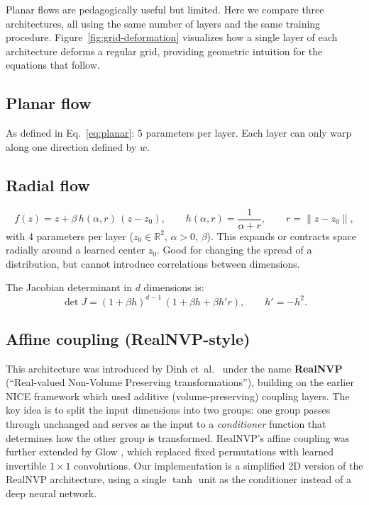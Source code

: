 \documentclass[11pt,letterpaper]{article}
\begin{document}
Planar flows are pedagogically useful but limited.
Here we compare three architectures, all using the same number of
layers and the same training procedure.
Figure~\ref{fig:grid-deformation} visualizes how a single layer of
each architecture deforms a regular grid, providing geometric intuition
for the equations that follow.

\subsection{Planar flow}
As defined in Eq.~\eqref{eq:planar}: 5 parameters per layer.
Each layer can only warp along one direction defined by $w$.

\subsection{Radial flow}
\begin{equation}
  f(z) = z + \beta\,h(\alpha, r)\,(z - z_0),
  \qquad h(\alpha, r) = \frac{1}{\alpha + r},
  \qquad r = \|z - z_0\|,
  \label{eq:radial}
\end{equation}
with 4 parameters per layer ($z_0 \in \mathbb{R}^2$, $\alpha > 0$, $\beta$).
This expands or contracts space radially around a learned center $z_0$.
Good for changing the spread of a distribution, but cannot introduce
correlations between dimensions.

The Jacobian determinant in $d$ dimensions is:
\begin{equation}
  \det J = (1 + \beta h)^{d-1}\,(1 + \beta h + \beta h' r),
  \qquad h' = -h^2.
\end{equation}

\subsection{Affine coupling (RealNVP-style)}
This architecture was introduced by Dinh et~al.\ \cite{dinh2017} under
the name \textbf{RealNVP} (``Real-valued Non-Volume Preserving
transformations''), building on the earlier NICE framework
\cite{dinh2014} which used additive (volume-preserving) coupling layers.
The key idea is to split the input dimensions into two groups: one group
passes through unchanged and serves as the input to a \emph{conditioner}
function that determines how the other group is transformed.
RealNVP's affine coupling was further extended by Glow
\cite{kingma2018}, which replaced fixed permutations with learned
invertible $1 \times 1$ convolutions.
Our implementation is a simplified 2D version of the RealNVP
architecture, using a single $\tanh$ unit as the conditioner instead
of a deep neural network.
\end{document}
